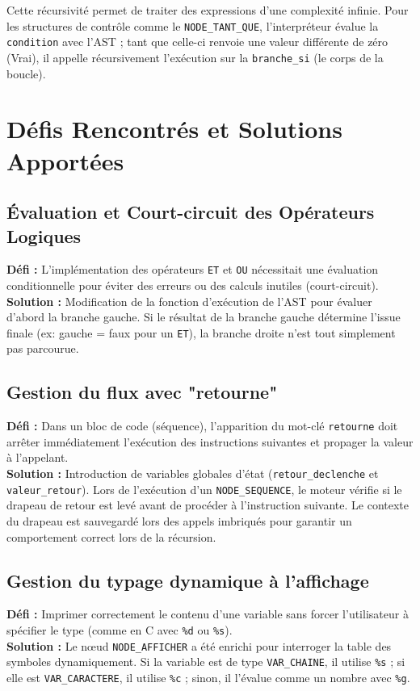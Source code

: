\documentclass[pfe ,titlesmallcaps]{isi_report}
\begin{document}
Cette récursivité permet de traiter des expressions d'une complexité infinie. Pour les structures de contrôle comme le \texttt{NODE\_TANT\_QUE}, l'interpréteur évalue la \texttt{condition} avec l'AST ; tant que celle-ci renvoie une valeur différente de zéro (Vrai), il appelle récursivement l'exécution sur la \texttt{branche\_si} (le corps de la boucle).

\chapter{Défis Rencontrés et Solutions Apportées}

\section{Évaluation et Court-circuit des Opérateurs Logiques}
\textbf{Défi :} L'implémentation des opérateurs \texttt{ET} et \texttt{OU} nécessitait une évaluation conditionnelle pour éviter des erreurs ou des calculs inutiles (court-circuit).\\
\textbf{Solution :} Modification de la fonction d'exécution de l'AST pour évaluer d'abord la branche gauche. Si le résultat de la branche gauche détermine l'issue finale (ex: gauche = faux pour un \texttt{ET}), la branche droite n'est tout simplement pas parcourue.

\section{Gestion du flux avec "retourne"}
\textbf{Défi :} Dans un bloc de code (séquence), l'apparition du mot-clé \texttt{retourne} doit arrêter immédiatement l'exécution des instructions suivantes et propager la valeur à l'appelant.\\
\textbf{Solution :} Introduction de variables globales d'état (\texttt{retour\_declenche} et \texttt{valeur\_retour}). Lors de l'exécution d'un \texttt{NODE\_SEQUENCE}, le moteur vérifie si le drapeau de retour est levé avant de procéder à l'instruction suivante. Le contexte du drapeau est sauvegardé lors des appels imbriqués pour garantir un comportement correct lors de la récursion.

\section{Gestion du typage dynamique à l'affichage}
\textbf{Défi :} Imprimer correctement le contenu d'une variable sans forcer l'utilisateur à spécifier le type (comme en C avec \texttt{\%d} ou \texttt{\%s}).\\
\textbf{Solution :} Le nœud \texttt{NODE\_AFFICHER} a été enrichi pour interroger la table des symboles dynamiquement. Si la variable est de type \texttt{VAR\_CHAINE}, il utilise \texttt{\%s} ; si elle est \texttt{VAR\_CARACTERE}, il utilise \texttt{\%c} ; sinon, il l'évalue comme un nombre avec \texttt{\%g}.
\end{document}
